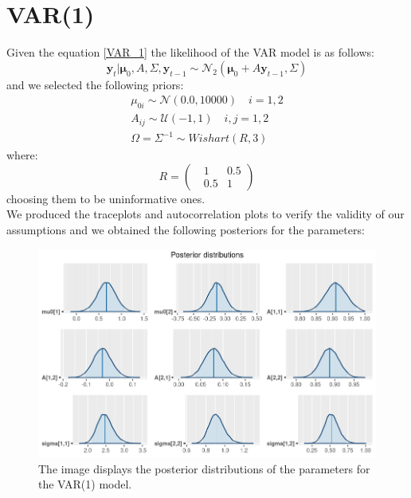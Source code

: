 \section*{VAR(1)}
Given the equation \ref{VAR_1} the likelihood of the VAR model is as follows:
\begin{equation}
    \mathbf{y}_{t}|\mathbf{\mu}_{0}, A, \Sigma, \mathbf{y}_{t-1} \sim \mathcal{N}_2(\mathbf{\mu}_{0} + A \mathbf{y}_{t-1}, \Sigma)
\end{equation}
and we selected the following priors:
\begin{equation}
    \begin{split}
        \mu_{0i} \sim \mathcal{N}(0.0, 10000) \quad i = 1, 2\\
        A_{ij} \sim \mathcal{U}(-1, 1) \quad i,j = 1, 2 \\
        \Omega = \Sigma^{-1} \sim Wishart(R, 3)
    \end{split}
\end{equation}
where:
\begin{equation}
    R = 
    \begin{pmatrix}
        \ \ \ 1 & 0.5 \\
        \ \ \ 0.5 & 1
    \end{pmatrix}
\end{equation}
choosing them to be uninformative ones. \\
We produced the traceplots and autocorrelation plots to verify the validity of our assumptions and we obtained the following posteriors for the parameters: \\
\begin{figure}[H]
    \centering
    \includegraphics[width=\textwidth]{images/6-VAR/posteriors.png}
    \caption{The image displays the posterior distributions of the parameters for the VAR(1) model.}
    \label{fig:VAR_posteriors}
\end{figure}
